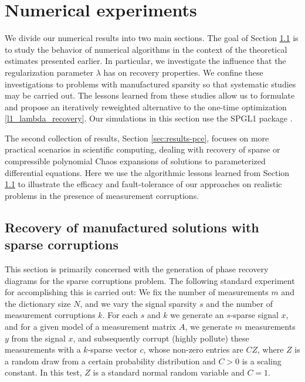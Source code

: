 \section{Numerical experiments}\label{sec:results}

We divide our numerical results into two main sections. The goal of Section \ref{sec:results-algorithm} is to study the behavior of numerical algorithms in the context of the theoretical estimates presented earlier. In particular, we investigate the influence that the regularization parameter $\lambda$ has on recovery properties. We confine these investigations to problems with manufactured sparsity so that systematic studies may be carried out. The lessons learned from these studies allow us to formulate and propose an iteratively reweighted alternative to the one-time optimization \eqref{l1_lambda_recovery}.  Our simulations in this section use the SPGL1 package \cite{spgl1:2007,BergFriedlander:2008}.

The second collection of results, Section \ref{sec:results-pce}, focuses on more practical scenarios in scientific computing, dealing with recovery of sparse or compressible polynomial Chaos expansions of solutions to parameterized differential equations. Here we use the algorithmic lessons learned from Section \ref{sec:results-algorithm} to illustrate the efficacy and fault-tolerance of our approaches on realistic problems in the presence of measurement corruptions.

\subsection{Recovery of manufactured solutions with sparse corruptions}\label{sec:results-algorithm}

This section is primarily concerned with the generation of phase recovery diagrams for the sparse corruptions problem.  The following standard experiment for accomplishing this is carried out: We fix the number of measurements $m$ and the dictionary size $N$, and we vary the signal sparsity $s$ and the number of measurement corruptions $k$. For each $s$ and $k$ we generate an $s$-sparse signal $x$, and for a given model of a measurement matrix $A$, we generate $m$ measurements $y$ from the signal $x$, and subsequently corrupt (highly pollute) these measurements with a $k$-sparse vector $c$, whose non-zero entries are $C Z$, where $Z$ is a random draw from a certain probability distribution and $C > 0$ is a scaling constant. In this test, $Z$ is a standard normal random variable and $C = 1$.

